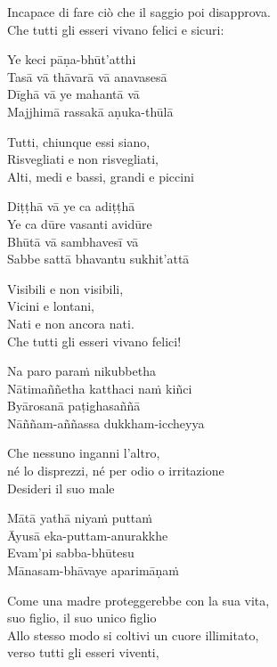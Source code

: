 \begin{english}
 Incapace di fare ciò che il saggio poi disapprova.\\
 Che tutti gli esseri vivano felici e sicuri:
\end{english}

Ye keci pāṇa-bhūt'atthi\\
Tasā vā thāvarā vā anavasesā\\
Dīghā vā ye mahantā vā\\
Majjhimā rassakā aṇuka-thūlā

\begin{english}
Tutti, chiunque essi siano,\\
Risvegliati e non risvegliati,\\
Alti, medi e bassi, grandi e piccini
\end{english}


Diṭṭhā vā ye ca adiṭṭhā\\
Ye ca dūre vasanti avidūre\\
Bhūtā vā sambhavesī vā\\
Sabbe sattā bhavantu sukhit'attā

\begin{english}
  Visibili e non visibili,\\
  Vicini e lontani,\\
  Nati e non ancora nati.\\
  Che tutti gli esseri vivano felici!
\end{english}

\clearpage

Na paro paraṁ nikubbetha\\
Nātimaññetha katthaci naṁ kiñci\\
Byārosanā paṭighasaññā\\
Nāññam-aññassa dukkham-iccheyya

\begin{english}
  Che nessuno inganni l'altro,\\
  né lo disprezzi, né per odio o irritazione\\
  Desideri il suo male
\end{english}

Mātā yathā niyaṁ puttaṁ\\
Āyusā eka-puttam-anurakkhe\\
Evam'pi sabba-bhūtesu\\
Mānasam-bhāvaye aparimāṇaṁ

\begin{english}
  Come una madre proteggerebbe con la sua vita,\\
   suo figlio, il suo unico figlio\\
   Allo stesso modo si coltivi un cuore illimitato,\\
    verso tutti gli esseri viventi,
\end{english}

